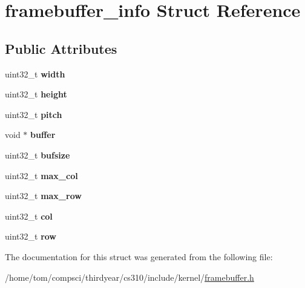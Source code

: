 \hypertarget{structframebuffer__info}{}\section{framebuffer\+\_\+info Struct Reference}
\label{structframebuffer__info}
\subsection*{Public Attributes}
\begin{DoxyCompactItemize}
\item 
\mbox{\label{structframebuffer__info_a9b9ec5fc0a883c166b2039f4a391f589}} 
uint32\+\_\+t {\bfseries width}
\item 
\mbox{\label{structframebuffer__info_a3614144fc030310eb513628fda7843b0}} 
uint32\+\_\+t {\bfseries height}
\item 
\mbox{\label{structframebuffer__info_aca25be2adea3175117c2b59174a9c4d6}} 
uint32\+\_\+t {\bfseries pitch}
\item 
\mbox{\label{structframebuffer__info_a9b751ed33a6f5bff9c5dfec4db214af3}} 
void $\ast$ {\bfseries buffer}
\item 
\mbox{\label{structframebuffer__info_a530737b60932eb53e8c68e12ff549e5e}} 
uint32\+\_\+t {\bfseries bufsize}
\item 
\mbox{\label{structframebuffer__info_a56b7c42040ca1a38227b6bd5612f8f8b}} 
uint32\+\_\+t {\bfseries max\+\_\+col}
\item 
\mbox{\label{structframebuffer__info_ad7f01a622046805e061e897cf9997ff4}} 
uint32\+\_\+t {\bfseries max\+\_\+row}
\item 
\mbox{\label{structframebuffer__info_a4efa2d9c0f395e015f0d246d981e5ea4}} 
uint32\+\_\+t {\bfseries col}
\item 
\mbox{\label{structframebuffer__info_a834742af0798750f74847b6f67d3b34f}} 
uint32\+\_\+t {\bfseries row}
\end{DoxyCompactItemize}


The documentation for this struct was generated from the following file\+:\begin{DoxyCompactItemize}
\item 
/home/tom/compsci/thirdyear/cs310/include/kernel/\mbox{\hyperlink{framebuffer_8h}{framebuffer.\+h}}\end{DoxyCompactItemize}
